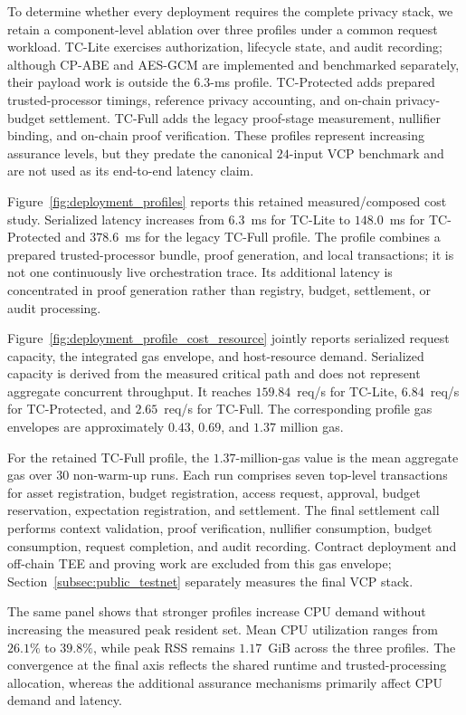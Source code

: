 \documentclass[10pt,journal,compsoc]{IEEEtran}
\begin{document}
To determine whether every deployment requires the complete privacy stack, we retain a component-level ablation over three profiles under a common request workload. \textsf{TC-Lite} exercises authorization, lifecycle state, and audit recording; although CP-ABE and AES-GCM are implemented and benchmarked separately, their payload work is outside the $6.3$-ms profile. \textsf{TC-Protected} adds prepared trusted-processor timings, reference privacy accounting, and on-chain privacy-budget settlement. \textsf{TC-Full} adds the legacy proof-stage measurement, nullifier binding, and on-chain proof verification. These profiles represent increasing assurance levels, but they predate the canonical $24$-input VCP benchmark and are not used as its end-to-end latency claim.

Figure~\ref{fig:deployment_profiles} reports this retained measured/composed cost study. Serialized latency increases from $6.3$~ms for \textsf{TC-Lite} to $148.0$~ms for \textsf{TC-Protected} and $378.6$~ms for the legacy \textsf{TC-Full} profile. The profile combines a prepared trusted-processor bundle, proof generation, and local transactions; it is not one continuously live orchestration trace. Its additional latency is concentrated in proof generation rather than registry, budget, settlement, or audit processing.

Figure~\ref{fig:deployment_profile_cost_resource} jointly reports serialized request capacity, the integrated gas envelope, and host-resource demand. Serialized capacity is derived from the measured critical path and does not represent aggregate concurrent throughput. It reaches $159.84$~req/s for \textsf{TC-Lite}, $6.84$~req/s for \textsf{TC-Protected}, and $2.65$~req/s for \textsf{TC-Full}. The corresponding profile gas envelopes are approximately $0.43$, $0.69$, and $1.37$ million gas.

For the retained \textsf{TC-Full} profile, the $1.37$-million-gas value is the mean aggregate gas over $30$ non-warm-up runs. Each run comprises seven top-level transactions for asset registration, budget registration, access request, approval, budget reservation, expectation registration, and settlement. The final settlement call performs context validation, proof verification, nullifier consumption, budget consumption, request completion, and audit recording. Contract deployment and off-chain TEE and proving work are excluded from this gas envelope; Section~\ref{subsec:public_testnet} separately measures the final VCP stack.

The same panel shows that stronger profiles increase CPU demand without increasing the measured peak resident set. Mean CPU utilization ranges from $26.1\%$ to $39.8\%$, while peak RSS remains $1.17$~GiB across the three profiles. The convergence at the final axis reflects the shared runtime and trusted-processing allocation, whereas the additional assurance mechanisms primarily affect CPU demand and latency.
\end{document}
